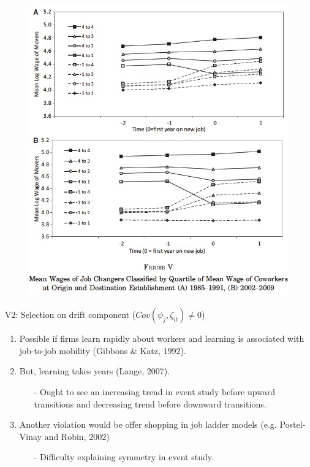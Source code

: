 \documentclass[notes=show]{beamer}
\begin{document}
\begin{frame}
\begin{figure}[p!]
	\begin{adjustbox}
 \includegraphics[width=.75\textwidth]{figures/Fig5} 
 	\end{adjustbox}
\end{figure}
\end{frame}

\begin{frame}{V2: Selection on drift component ($Cov(\psi_{j},\zeta_{it}) \neq 0$)}
	\begin{enumerate}
		\item Possible if firms learn rapidly about workers and learning is associated with job-to-job mobility (Gibbons \& Katz, 1992). \medskip
            \item But, learning takes years (Lange, 2007). 
            \begin{itemize} \smallskip
                \item[-] Ought to see an increasing trend in event study before upward transitions and decreasing trend before downward transitions.
            \end{itemize} \medskip
            \item Another violation would be offer shopping in job ladder models (e.g. Postel‐Vinay and Robin, 2002)
            \begin{itemize} \smallskip
                \item[-] Difficulty explaining symmetry in event study. 
            \end{itemize}
	\end{enumerate}
\end{frame}
\end{document}
